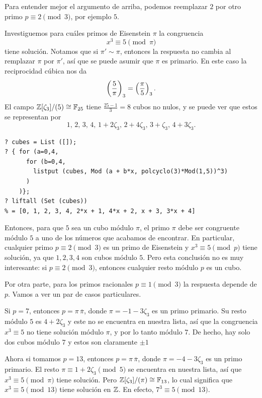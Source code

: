 Para entender mejor el argumento de arriba, podemos reemplazar $2$ por otro
primo $p \equiv 2 \pmod{3}$, por ejemplo $5$.

\begin{ejemplo}
  Investiguemos para cuáles primos de Eisenstein $\pi$ la congruencia
  $$x^3 \equiv 5\pmod{\pi}$$  
  tiene solución. Notamos que si $\pi' \sim \pi$, entonces
  la respuesta no cambia al remplazar $\pi$ por $\pi'$, así que se puede
  asumir que $\pi$ es primario. En este caso la reciprocidad cúbica nos da
  $$\left(\frac{5}{\pi}\right)_3 = \left(\frac{\pi}{5}\right)_3.$$
  El campo $\mathbb{Z}[\zeta_3]/(5) \cong \mathbb{F}_{25}$ tiene $\frac{25-1}{3} = 8$ cubos
  no nulos, y se puede ver que estos se representan por
  \[ 1, \, 2, \, 3, \, 4, \,
         1 + 2\zeta_3, \, 2 + 4\zeta_3, \, 3 + \zeta_3, \, 4 + 3\zeta_3. \]

  \begin{shaded}
\begin{verbatim}
? cubes = List ([]);
? { for (a=0,4,
      for (b=0,4,
        listput (cubes, Mod (a + b*x, polcyclo(3)*Mod(1,5))^3)
      )
    )};
? liftall (Set (cubes))
% = [0, 1, 2, 3, 4, 2*x + 1, 4*x + 2, x + 3, 3*x + 4]
\end{verbatim}
  \end{shaded}

  Entonces, para que $5$ sea un cubo módulo $\pi$, el primo $\pi$ debe ser
  congruente módulo $5$ a uno de los números que acabamos de encontrar. En
  particular, cualquier primo $p \equiv 2 \pmod{3}$ es un primo de Eisenstein y
  $x^3 \equiv 5 \pmod{p}$ tiene solución, ya que $1,2,3,4$ son cubos módulo $5$.
  Pero esta conclusión no es muy interesante: si $p \equiv 2 \pmod{3}$, entonces
  cualquier resto módulo $p$ es un cubo.

  Por otra parte, para los primos racionales $p \equiv 1 \pmod{3}$ la respuesta
  depende de $p$. Vamos a ver un par de casos particulares.

  Si $p = 7$, entonces $p = \pi\,\overline{\pi}$, donde $\pi = -1 - 3\zeta_3$ es
  un primo primario. Su resto módulo $5$ es $4 + 2\zeta_3$ y este no se
  encuentra en nuestra lista, así que la congruencia $x^3 \equiv 5$ no tiene
  solución módulo $\pi$, y por lo tanto módulo $7$. De hecho, hay solo dos
  cubos módulo $7$ y estos son claramente $\pm 1$

  Ahora si tomamos $p = 13$, entonces $p = \pi\,\overline{\pi}$, donde
  $\pi = -4 - 3\zeta_3$ es un primo primario. El resto
  $\pi \equiv 1 + 2\zeta_3 \pmod{5}$ se encuentra en nuestra lista, así que
  $x^3 \equiv 5 \pmod{\pi}$ tiene solución.
  Pero $\mathbb{Z} [\zeta_3]/(\pi) \cong \mathbb{F}_{13}$, lo cual significa que
  $x^3 \equiv 5 \pmod{13}$ tiene solución en $\mathbb{Z}$.
  En efecto, $7^3 \equiv 5 \pmod{13}$.
\end{ejemplo}

